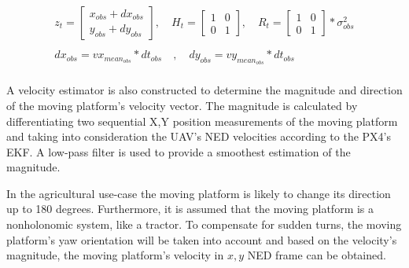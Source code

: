 \documentclass[conference]{IEEEtran}
\begin{document}
\begin{equation}
    \begin{array}{l}
    z_{t} = \begin{bmatrix} 
                x_{obs} + dx_{obs} \\ 
                y_{obs} + dy_{obs}
                \end{bmatrix}, \quad 


    
    H_{t}= \begin{bmatrix} 
                1 & 0 \\ 
                0 & 1
                \end{bmatrix}, \quad
    R_{t} = \begin{bmatrix} 
                1 & 0 \\ 
                0 & 1
                \end{bmatrix}*\sigma^{2}_{obs}  \\ \\
                
dx_{obs} = vx_{mean_{obs}} * dt_{obs} \quad , \quad
    dy_{obs} = vy_{mean_{obs}} * dt_{obs} \quad \\
          
    \end{array}
\end{equation}

A velocity estimator is also constructed to determine the magnitude and direction of the moving platform's velocity vector. The magnitude is calculated by differentiating two sequential X,Y position measurements of the moving platform and taking into consideration the UAV's NED velocities according to the PX4's EKF. A low-pass filter is used to provide a smoothest estimation of the magnitude. 

In the agricultural use-case the moving platform is likely to change its direction up to 180 degrees. Furthermore, it is assumed that the moving platform is a nonholonomic system, like a tractor. To compensate for sudden turns, the moving platform's yaw orientation will be taken into account and based on the velocity's magnitude, the moving platform's velocity in \(x,y\) NED frame can be obtained.
\end{document}
